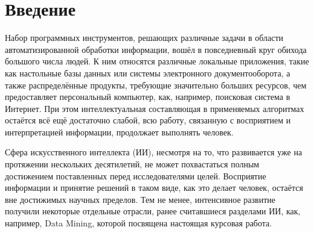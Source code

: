 \section*{Введение}

Набор программных инструментов, решающих различные задачи в области
автоматизированной обработки информации, вошёл в повседневный круг
обихода большого числа людей. К ним относятся различные локальные
приложения, такие как настольные базы данных или системы электронного
документооборота, а также распределённые продукты, требующие
значительно больших ресурсов, чем предоставляет персональный
компьютер, как, например, поисковая система в Интернет. При этом
интеллектуальная составляющая в применяемых алгоритмах остаётся всё
ещё достаточно слабой, всю работу, связанную с восприятием и
интерпретацией информации, продолжает выполнять человек.

Сфера искусственного интеллекта (ИИ), несмотря на то, что развивается
уже на протяжении нескольких десятилетий, не может похвастаться полным
достижением поставленных перед исследователями целей. Восприятие
информации и принятие решений в таком виде, как это делает человек,
остаётся вне достижимых научных пределов. Тем не менее, интенсивное
развитие получили некоторые отдельные отрасли, ранее считавшиеся
разделами ИИ, как, например, Data Mining, которой посвящена настоящая
курсовая работа.
